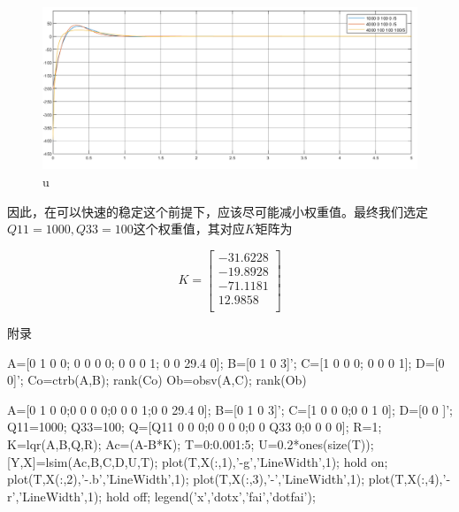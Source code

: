 \documentclass{MathorCupmodeling}
\begin{document}
\begin{figure}[hbpt]
\centering
\includegraphics[width=12cm]{u.png}
\caption{u}\label{u}
\end{figure}

因此，在可以快速的稳定这个前提下，应该尽可能减小权重值。最终我们选定$Q11=1000,Q33=100$这个权重值，其对应$K$矩阵为

\begin{equation}
K=
\begin{bmatrix}
-31.6228\\
-19.8928\\
-71.1181\\
12.9858\\
\end{bmatrix}
\end{equation}
\newpage
	\appendix
	\begin{center}
		\heiti{} 附\hspace{1pc}录
	\end{center}

\begin{matlab}
A=[0 1 0 0;
   0 0 0 0;
   0 0 0 1;
   0 0 29.4 0];
B=[0 1 0 3]';
C=[1 0 0 0;
   0 0 0 1];
D=[0 0]';
Co=ctrb(A,B);
rank(Co)
Ob=obsv(A,C);
rank(Ob)
\end{matlab}

\begin{matlab}
A=[0 1 0 0;0 0 0 0;0 0 0 1;0 0 29.4 0];
B=[0 1 0 3]';
C=[1 0 0 0;0 0 1 0];
D=[0 0 ]';
Q11=1000;
Q33=100;%
Q=[Q11 0 0 0;0 0 0 0;0 0 Q33 0;0 0 0 0];
R=1;
K=lqr(A,B,Q,R);
Ac=(A-B*K);
T=0:0.001:5;
U=0.2*ones(size(T));
[Y,X]=lsim(Ac,B,C,D,U,T);%
plot(T,X(:,1),'-g','LineWidth',1);
hold on;
plot(T,X(:,2),'-.b','LineWidth',1);
plot(T,X(:,3),'-','LineWidth',1);
plot(T,X(:,4),'-r','LineWidth',1);
hold off;
legend('x','dotx','fai','dotfai');
\end{matlab}
\end{document}
